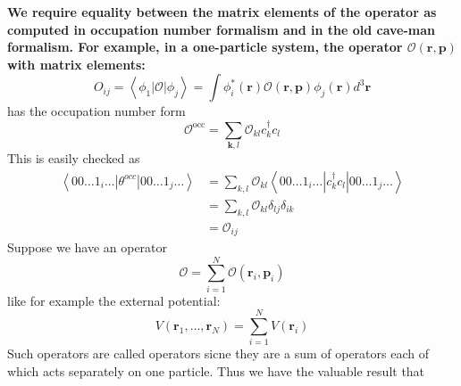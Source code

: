 \textbf{} \textbf{We require equality between the matrix elements of the operator as computed in occupation number formalism and in the old cave-man formalism. For example, in a one-particle system, the operator $\mathcal{O}(\mathbf{r,p})$ with matrix elements:}
\begin{equation}O_{ij}=\left\langle\phi_{1}|\mathcal{O}| \phi_{j}\right\rangle=\int \phi_{i}^{*}(\mathbf{r}) \mathcal{O}(\mathbf{r}, \mathbf{p}) \phi_{j}(\mathbf{r}) d^{3} \mathbf{r}\end{equation}
has the occupation number form
\begin{equation}\mathcal{O}^{\mathrm{occ}}=\sum_{\boldsymbol{k}, l} \mathcal{O}_{k l} c_{k}^{\dagger} c_{l}
\label{one-body-interaction-occ}
\end{equation}
This is easily checked as
\begin{equation}\begin{aligned}
\left\langle 00 \ldots 1_{i} \ldots\left|\theta^{occ}\right| 00 \ldots 1_{j} \ldots\right\rangle &=\sum_{k, l} \mathcal{O}_{k l}\left\langle 00 \ldots 1_{i} \ldots\left|c_{k}^{\dagger} c_{l}\right| 00 \ldots 1_{j} \ldots\right\rangle \\
&=\sum_{k, l} \mathcal{O}_{k l} \delta_{lj} \delta_{i k}\\
&=\mathcal{O}_{ij}
\end{aligned}\end{equation}
Suppose we have an operator
\begin{equation}\mathcal{O}=\sum_{i=1}^{N} \mathcal{O}\left(\mathbf{r}_{i}, \mathbf{p}_{i}\right)\end{equation}
like for example the external potential:
\begin{equation}V\left(\mathbf{r}_{1}, \dots, \mathbf{r}_{N}\right)=\sum_{i=1}^{N} V\left(\mathbf{r}_{i}\right)\end{equation}
Such operators are called  operators sicne they are a sum of operators each of which acts separately on one particle. Thus we have the valuable result that \textbf{}

